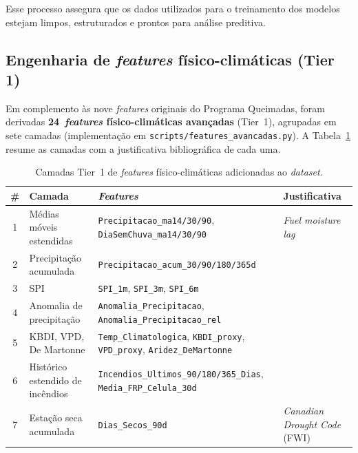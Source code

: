 Esse processo assegura que os dados utilizados para o treinamento dos modelos estejam limpos, estruturados e prontos para análise preditiva.

\subsection{Engenharia de \emph{features} físico-climáticas (Tier 1)}
\label{subsec:metod_features_tier1}

Em complemento às nove \emph{features} originais do Programa Queimadas, foram derivadas \textbf{24~\emph{features} físico-climáticas avançadas} (Tier~1), agrupadas em sete camadas (implementação em \texttt{scripts/features\_avancadas.py}). A Tabela~\ref{tab:metod_tier1} resume as camadas com a justificativa bibliográfica de cada uma.

\begin{table}[h]
\centering
\caption{Camadas Tier~1 de \emph{features} físico-climáticas adicionadas ao \emph{dataset}.}
\label{tab:metod_tier1}
\small
\begin{tabular}{clp{6cm}l}
\toprule
\textbf{\#} & \textbf{Camada} & \textbf{\emph{Features}} & \textbf{Justificativa} \\
\midrule
1 & Médias móveis estendidas & \texttt{Precipitacao\_ma14/30/90}, \texttt{DiaSemChuva\_ma14/30/90} & \emph{Fuel moisture lag}~\cite{seager2015climatology} \\
2 & Precipitação acumulada & \texttt{Precipitacao\_acum\_30/90/180/365d} & \cite{seager2015climatology} \\
3 & SPI & \texttt{SPI\_1m}, \texttt{SPI\_3m}, \texttt{SPI\_6m} & \cite{mckee1993spi,npjhazards2025fire} \\
4 & Anomalia de precipitação & \texttt{Anomalia\_Precipitacao}, \texttt{Anomalia\_Precipitacao\_rel} & \cite{forests2024cerradoamazon} \\
5 & KBDI, VPD, De Martonne & \texttt{Temp\_Climatologica}, \texttt{KBDI\_proxy}, \texttt{VPD\_proxy}, \texttt{Aridez\_DeMartonne} & \cite{keetch1968drought,seager2015climatology,demartonne1926aridity,forests2024cerradoamazon} \\
6 & Histórico estendido de incêndios & \texttt{Incendios\_Ultimos\_90/180/365\_Dias}, \texttt{Media\_FRP\_Celula\_30d} & \cite{cheerala2025probabilistic} \\
7 & Estação seca acumulada & \texttt{Dias\_Secos\_90d} & \emph{Canadian Drought Code} (FWI) \\
\bottomrule
\end{tabular}
\end{table}

